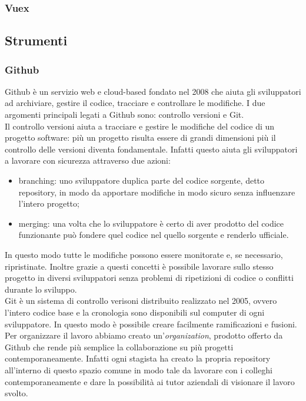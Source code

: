 \subsubsection{Vuex}

\subsection{Strumenti}

\subsubsection{Github}

Github è un servizio web e cloud-based fondato nel 2008 che aiuta gli sviluppatori ad archiviare, gestire il codice, tracciare e controllare le modifiche. I due argomenti principali legati a Github sono: controllo versioni e Git.\\
Il controllo versioni aiuta a tracciare e gestire le modifiche del codice di un progetto software: più un progetto risulta essere di grandi dimensioni più il controllo delle versioni diventa fondamentale. Infatti questo aiuta gli sviluppatori a lavorare con sicurezza attraverso due azioni:
\begin{itemize}
	\item branching: uno sviluppatore duplica parte del codice sorgente, detto repository, in modo da apportare modifiche in modo sicuro senza influenzare l'intero progetto;
	\item merging: una volta che lo sviluppatore è certo di aver prodotto del codice funzionante può fondere quel codice nel quello sorgente e renderlo ufficiale.
\end{itemize}
In questo modo tutte le modifiche possono essere monitorate e, se necessario, ripristinate. Inoltre grazie a questi concetti è possibile lavorare sullo stesso progetto in diversi sviluppatori senza problemi di ripetizioni di codice o conflitti durante lo sviluppo.\\
Git è un sistema di controllo verisoni distribuito realizzato nel 2005, ovvero l'intero codice base e la cronologia sono disponibili sul computer di ogni sviluppatore. In questo modo è possibile creare facilmente ramificazioni e fusioni.\\
Per organizzare il lavoro abbiamo creato un'\textit{organization}, prodotto offerto da Github che rende più semplice la collaborazione su più progetti contemporaneamente. Infatti ogni stagista ha creato la propria repository all'interno di questo spazio comune in modo tale da lavorare con i colleghi contemporaneamente e dare la possibilità ai tutor aziendali di visionare il lavoro svolto.

